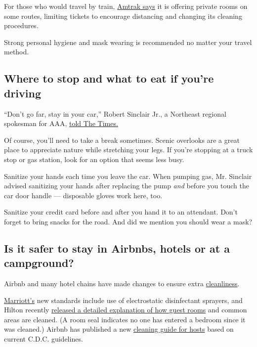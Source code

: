 For those who would travel by train,
\href{https://www.amtrak.com/coronavirus}{Amtrak says} it is offering
private rooms on some routes, limiting tickets to encourage distancing
and changing its cleaning procedures.

Strong personal hygiene and mask wearing is recommended no matter your
travel method.

\hypertarget{where-to-stop-and-what-to-eat-if-youre-driving}{%
\subsection{Where to stop and what to eat if you're
driving}\label{where-to-stop-and-what-to-eat-if-youre-driving}}

``Don't go far, stay in your car,'' Robert Sinclair Jr., a Northeast
regional spokesman for AAA,
\href{https://www.nytimes3xbfgragh.onion/interactive/2020/world/coronavirus-tips-advice.html?action=click\&pgtype=Article\&state=default\&module=styln-coronavirus-national\&variant=show\&region=TOP_BANNER\&context=storylines_menu}{told
The Times.}

Of course, you'll need to take a break sometimes. Scenic overlooks are a
great place to appreciate nature while stretching your legs. If you're
stopping at a truck stop or gas station, look for an option that seems
less busy.

Sanitize your hands each time you leave the car. When pumping gas, Mr.
Sinclair advised sanitizing your hands after replacing the pump
\emph{and} before you touch the car door handle --- disposable gloves
work here, too.

Sanitize your credit card before and after you hand it to an attendant.
Don't forget to bring snacks for the road. And did we mention you should
wear a mask?

\hypertarget{is-it-safer-to-stay-in-airbnbs-hotels-or-at-a-campground}{%
\subsection{Is it safer to stay in Airbnbs, hotels or at a
campground?}\label{is-it-safer-to-stay-in-airbnbs-hotels-or-at-a-campground}}

Airbnb and many hotel chains have made changes to ensure extra
\href{https://www.nytimes3xbfgragh.onion/2020/06/03/travel/the-most-important-word-in-the-hospitality-industry-clean.html}{cleanliness}.

\href{https://news.marriott.com/news/2020/04/21/marriott-international-launches-global-cleanliness-council-to-promote-even-higher-standards-of-cleanliness-in-the-age-of-covid-19}{Marriott's}
new standards include use of electrostatic disinfectant sprayers, and
Hilton recently
\href{https://www.hilton.com/en/corporate/cleanstay/}{released a
detailed explanation of how guest rooms} and common areas are cleaned.
(A room seal indicates no one has entered a bedroom since it was
cleaned.) Airbnb has published a new
\href{https://www.airbnb.com/resources/hosting-homes/a/cleaning-guidelines-to-help-prevent-the-spread-of-covid-19-163}{cleaning
guide for hosts} based on current C.D.C. guidelines.

